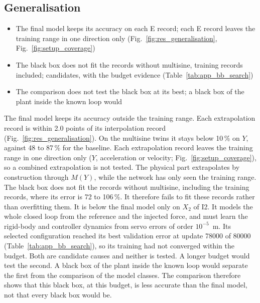 \subsection{Generalisation}
\ifdraft
\begin{itemize}
\item The final model keeps its accuracy on each E record; each E record leaves the training range in one direction only (Fig.~\ref{fig:res_generalisation}, Fig.~\ref{fig:setup_coverage})
\item The black box does not fit the records without multisine, training records included; candidates, with the budget evidence (Table~\ref{tab:app_bb_search})
\item The comparison does not test the black box at its best; a black box of the plant inside the known loop would
\end{itemize}
\fi
The final model keeps its accuracy outside the training range.
Each extrapolation record is within 2.0 points of its interpolation record
(Fig.~\ref{fig:res_generalisation}).
On the multisine twins it stays below 10\,\% on $Y$, against 48 to 87\,\% for
the baseline.
Each extrapolation record leaves the training range in one direction only
($Y$, acceleration or velocity; Fig.~\ref{fig:setup_coverage}), so a
combined extrapolation is not tested.
The physical part extrapolates by construction through $M(Y)$, while the
network has only seen the training range.
\\
The black box does not fit the records without multisine, including the
training records, where its error is 72 to 106\,\%.
It therefore fails to fit these records rather than overfitting them.
It is below the final model only on $X_2$ of I2.
It models the whole closed loop from the reference and the injected force,
and must learn the rigid-body and controller dynamics from servo errors of
order $10^{-5}$~m.
Its selected configuration reached its best validation error at update 78000
of 80000 (Table~\ref{tab:app_bb_search}), so its training had not converged
within the budget.
Both are candidate causes and neither is tested.
A longer budget would test the second.
A black box of the plant inside the known loop would separate the first from
the comparison of the model classes.
The comparison therefore shows that this black box, at this budget, is less
accurate than the final model, not that every black box would be.

